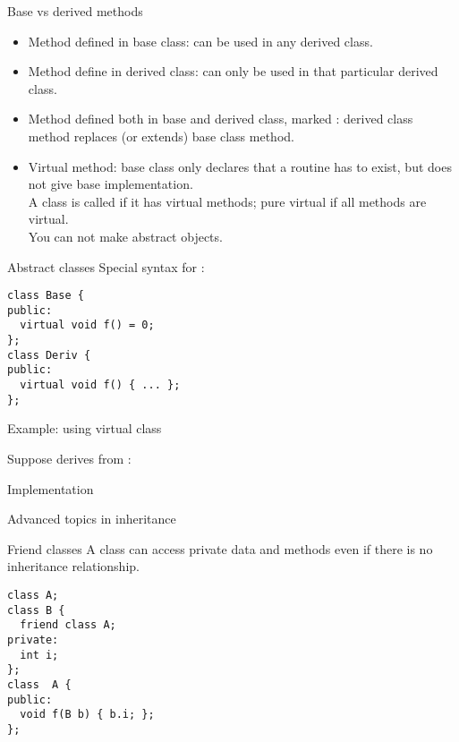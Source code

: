 \begin{block}{Base vs derived methods}
  \begin{itemize}
  \item Method defined in base class: can be used in any derived class.
  \item Method define in derived class: can only be used in that
    particular derived class.
  \item Method defined both in base and derived class, marked
    : derived class method replaces (or extends)
    base class method.
  \item Virtual method: base class only declares that a routine has to
    exist, but does not give base implementation.\\ A class is called
     if it has virtual methods; pure
    virtual if all methods are virtual.\\ You can not make abstract objects.
  \end{itemize}  
\end{block}

\begin{block}{Abstract classes}
  Special syntax for :
\begin{lstlisting}
class Base {
public:
  virtual void f() = 0;
};
class Deriv {
public:
  virtual void f() { ... };
};
\end{lstlisting}
\end{block}

\begin{block}{Example: using virtual class}
  \small
  \begin{multicols}{2}
    \vfill\columnbreak
    Suppose  derives from :\\
  \end{multicols}
\end{block}

\begin{block}{Implementation}
  \footnotesize
  \begin{multicols}{2}
    \vfill\columnbreak
  \end{multicols}
\end{block}

 {Advanced topics in inheritance}

\begin{block}{Friend classes}
  \label{sl:obj-friend}
  A  class can access private data and methods
  even if there is no inheritance relationship.
\begin{lstlisting}
class A;
class B {
  friend class A;
private:
  int i;
};
class  A {
public: 
  void f(B b) { b.i; };
};
\end{lstlisting}
\end{block}

